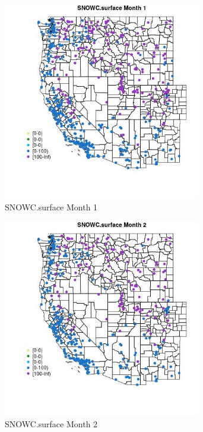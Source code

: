 \begin{figure} 
\centering  
\includegraphics[width=0.77\textwidth]{Code_Outputs/Report_ML_input_PM25_Step4_part_e_de_duplicated_aves_compiled_2019-05-18wNAs_MapObsMo1SNOWCsurface.jpg} 
\caption{\label{fig:Report_ML_input_PM25_Step4_part_e_de_duplicated_aves_compiled_2019-05-18wNAsMapObsMo1SNOWCsurface}SNOWC.surface Month 1} 
\end{figure} 
 

\begin{figure} 
\centering  
\includegraphics[width=0.77\textwidth]{Code_Outputs/Report_ML_input_PM25_Step4_part_e_de_duplicated_aves_compiled_2019-05-18wNAs_MapObsMo2SNOWCsurface.jpg} 
\caption{\label{fig:Report_ML_input_PM25_Step4_part_e_de_duplicated_aves_compiled_2019-05-18wNAsMapObsMo2SNOWCsurface}SNOWC.surface Month 2} 
\end{figure} 
 

